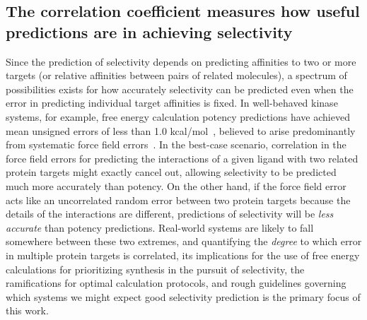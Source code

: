 \documentclass[phd,tocprelim]{cornell}
\begin{document}
\subsection{The correlation coefficient measures how useful predictions are in achieving selectivity}
Since the prediction of selectivity depends on predicting affinities to two or more targets (or relative affinities between pairs of related molecules), a spectrum of possibilities exists for how accurately selectivity can be predicted even when the error in predicting individual target affinities is fixed.
In well-behaved kinase systems, for example, free energy calculation potency predictions have achieved mean unsigned errors of less than 1.0 kcal/mol~\citep{Wang:J.Am.Chem.Soc.:2015,Abel2017-gw}, believed to arise predominantly from systematic force field errors~\cite{Harder:J.Chem.TheoryComput.:2016}.
In the best-case scenario, correlation in the force field errors for predicting the interactions of a given ligand with two related protein targets might exactly cancel out, allowing selectivity to be predicted much more accurately than potency.
On the other hand, if the force field error acts like an uncorrelated random error between two protein targets because the details of the interactions are different, predictions of selectivity will be \emph{less accurate} than potency predictions.
Real-world systems are likely to fall somewhere between these two extremes, and quantifying the \emph{degree} to which error in multiple protein targets is correlated, its implications for the use of free energy calculations for prioritizing synthesis in the pursuit of selectivity, the ramifications for optimal calculation protocols, and rough guidelines governing which systems we might expect good selectivity prediction is the primary focus of this work.
\end{document}
